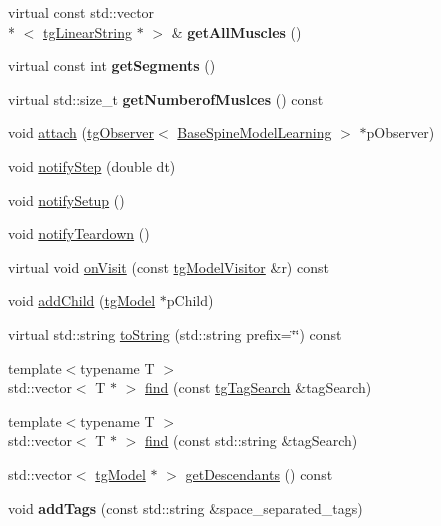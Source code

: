 \begin{DoxyCompactItemize}
\item 
\hypertarget{class_base_spine_model_learning_a508eae423b9fd9e194b620563b15b9db}{virtual const std\-::vector\\*
$<$ \hyperlink{classtg_linear_string}{tg\-Linear\-String} $\ast$ $>$ \& {\bfseries get\-All\-Muscles} ()}\label{class_base_spine_model_learning_a508eae423b9fd9e194b620563b15b9db}

\item 
\hypertarget{class_base_spine_model_learning_af38ddf518f0b9d524d869591216070fd}{virtual const int {\bfseries get\-Segments} ()}\label{class_base_spine_model_learning_af38ddf518f0b9d524d869591216070fd}

\item 
\hypertarget{class_base_spine_model_learning_a21c0b6e4c84e4f61b92d803dd677525f}{virtual std\-::size\-\_\-t {\bfseries get\-Numberof\-Muslces} () const }\label{class_base_spine_model_learning_a21c0b6e4c84e4f61b92d803dd677525f}

\item 
void \hyperlink{classtg_subject_a56ecfd33a048c3a7f1a884318d9af548}{attach} (\hyperlink{classtg_observer}{tg\-Observer}$<$ \hyperlink{class_base_spine_model_learning}{Base\-Spine\-Model\-Learning} $>$ $\ast$p\-Observer)
\item 
void \hyperlink{classtg_subject_ad9640aa7fcc1e0b4ce8a913a4ce1ea42}{notify\-Step} (double dt)
\item 
void \hyperlink{classtg_subject_a80799e5d0c8512d3d05a55764790392b}{notify\-Setup} ()
\item 
void \hyperlink{classtg_subject_adf7a60dbb0faf0de5528f862e7953e63}{notify\-Teardown} ()
\item 
virtual void \hyperlink{classtg_model_aee6457e0fc54d5570b87bfc779f9b1c0}{on\-Visit} (const \hyperlink{classtg_model_visitor}{tg\-Model\-Visitor} \&r) const 
\item 
void \hyperlink{classtg_model_a292c17848b96caee32b2286e44c13f2f}{add\-Child} (\hyperlink{classtg_model}{tg\-Model} $\ast$p\-Child)
\item 
virtual std\-::string \hyperlink{classtg_model_af37b0c1a6d4060bfe0bb9b5038a17725}{to\-String} (std\-::string prefix=\char`\"{}\char`\"{}) const 
\item 
{\footnotesize template$<$typename T $>$ }\\std\-::vector$<$ T $\ast$ $>$ \hyperlink{classtg_model_ab75836fdfbd9200f165c3b28a19630c0}{find} (const \hyperlink{classtg_tag_search}{tg\-Tag\-Search} \&tag\-Search)
\item 
{\footnotesize template$<$typename T $>$ }\\std\-::vector$<$ T $\ast$ $>$ \hyperlink{classtg_model_aa40b5fb32f8941e04d537f4e6c6db35c}{find} (const std\-::string \&tag\-Search)
\item 
std\-::vector$<$ \hyperlink{classtg_model}{tg\-Model} $\ast$ $>$ \hyperlink{classtg_model_a2efa4321fa5c77b4ce23b01f6fd3a1c4}{get\-Descendants} () const 
\item 
\hypertarget{classtg_taggable_af0b8f1729653b0b90d2fecbd51163612}{void {\bfseries add\-Tags} (const std\-::string \&space\-\_\-separated\-\_\-tags)}\label{classtg_taggable_af0b8f1729653b0b90d2fecbd51163612}


\end{DoxyCompactItemize}
